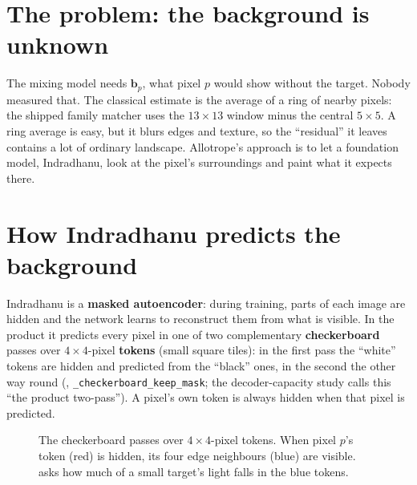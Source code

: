 \documentclass[11pt,a4paper,oneside,openany]{book}
\newcommand{\B}[1]{{\symbf{#1}}}
\newcommand{\B}[1]{{\bm{#1}}}
\newcommand{\vb}{\B{b}}
\begin{document}
\section{The problem: the background is unknown}

The mixing model needs $\vb_p$, what pixel $p$ would show without the target. Nobody measured that. The classical estimate is the
average of a ring of nearby pixels: the shipped family matcher uses the $13\times13$ window minus the central $5\times5$. A ring
average is easy, but it blurs edges and texture, so the ``residual'' it leaves contains a lot of ordinary landscape. Allotrope's
approach is to let a foundation model, Indradhanu, look at the pixel's surroundings and paint what it expects there.

\section{How Indradhanu predicts the background}

Indradhanu is a \textbf{masked autoencoder}: during training, parts of each image are hidden and the network learns to reconstruct
them from what is visible. In the product it predicts every pixel in one of two complementary \textbf{checkerboard} passes over
$4\times4$-pixel \textbf{tokens} (small square tiles): in the first pass the ``white'' tokens are hidden and predicted from the
``black'' ones, in the second the other way round (,
\texttt{\_checkerboard\_keep\_mask}; the decoder-capacity study calls this ``the product two-pass''). A pixel's own token is always
hidden when that pixel is predicted.

\begin{figure}[ht]
\centering
{}
\caption{The checkerboard passes over $4\times4$-pixel tokens. When pixel $p$'s token (red) is hidden, its four edge neighbours
(blue) are visible.  asks how much of a small target's light falls in the blue tokens.}
\label{fig:checker}
\end{figure}
\end{document}
